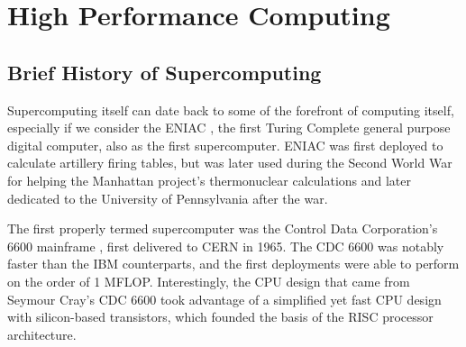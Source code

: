 \section{High Performance Computing}
\label{sec:hpc}


\subsection{Brief History of Supercomputing}

Supercomputing itself can date back to some of the forefront of computing itself, especially if we consider the ENIAC \cite{goldstine1946electronic}, the first Turing Complete general purpose digital computer, also as the first supercomputer.  ENIAC was first deployed to calculate artillery firing tables, but was later used during the Second World War for helping the Manhattan project's thermonuclear calculations and later dedicated to the University of Pennsylvania after the war. 

The first properly termed supercomputer was the Control Data Corporation's  6600 mainframe \cite{thornton1970design}, first delivered to CERN in 1965. The CDC 6600 was notably faster than the IBM counterparts, and the first deployments were able to perform on the order of 1 MFLOP. Interestingly, the CPU design that came from Seymour Cray's  CDC 6600 took advantage of a simplified yet fast CPU design with silicon-based transistors, which founded the basis of the RISC processor architecture. 


